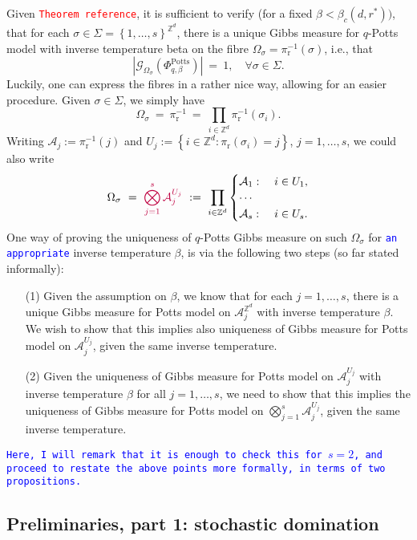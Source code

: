 \documentclass[12pt]{article}
\newcommand{\A}{\mathcal{A}}
\newcommand{\G}{\mathcal{G}}
\renewcommand{\r}{\mathrm{r}}
\newcommand{\Z}{\mathbb{Z}}
\newcommand{\Potts}{\mathrm{Potts}}
\newcommand{\set}[1]{\left\{#1\right\}}
\newcommand{\1}{\mathbbm{1}}
\newcommand{\5}{\vspace{0.5cm}}
\theoremstyle{definition}
\begin{document}
Given \textcolor{red}{\texttt{Theorem reference}}, it is sufficient to verify (for a fixed $\beta<\beta_c(d,r^*))$, that for each $\sigma\in\Sigma=\set{1,\ldots,s}^{\Z^d}$, there is a unique Gibbs measure for $q$-Potts model with inverse temperature beta on the fibre $\Omega_\sigma=\pi_\r^{-1}(\sigma)$, i.e., that
$$|\G_{\Omega_\sigma}(\Phi_{q,\beta}^\Potts)| ~=~ 1, \quad \forall \sigma\in\Sigma.$$
Luckily, one can express the fibres in a rather nice way, allowing for an easier procedure. Given $\sigma\in\Sigma$, we simply have
$$\Omega_\sigma ~=~ \pi_{\r}^{-1} ~=~ \prod_{i\in\Z^d}\pi_{\r}^{-1}(\sigma_i).$$
Writing $\A_j:=\pi_{\r}^{-1}(j)$ and $U_j:=\set{i\in\Z^d:\pi_{\r}(\sigma_i)=j}$, $j=1,\ldots,s$, we could also write
$$\Omega_\sigma ~=~ \textcolor{purple}{\bigotimes_{j=1}^s\A_j^{U_j}} ~:=~ \prod_{i\in\Z^d}\begin{cases}\A_1:~&i\in U_1,\\
\cdots\\
\A_s:~&i\in U_s.\end{cases}$$
One way of proving the uniqueness of $q$-Potts Gibbs measure on such $\Omega_\sigma$ for \textcolor{blue}{\texttt{an appropriate}} inverse temperature $\beta$, is via the following two steps (so far stated informally):
\begin{itemize}
	\item[(1)] Given the assumption on $\beta$, we know that for each $j=1,\ldots,s$, there is a unique Gibbs measure for Potts model on $\A_j^{\Z^d}$ with inverse temperature $\beta$. We wish to show that this implies also uniqueness of Gibbs measure for Potts model on $\A_j^{U_j}$, given the same inverse temperature.
	\item[(2)] Given the uniqueness of Gibbs measure for Potts model on $\A_j^{U_j}$ with inverse temperature $\beta$ for all $j=1,\ldots,s$, we need to show that this implies the uniqueness of Gibbs measure for Potts model on $\bigotimes_{j=1}^s \A_j^{U_j}$, given the same inverse temperature.
\end{itemize}
\textcolor{blue}{\texttt{Here, I will remark that it is enough to check this for $s=2$, and proceed to restate the above points more formally, in terms of two propositions.}}


\subsection{Preliminaries, part 1: stochastic domination}
\end{document}
